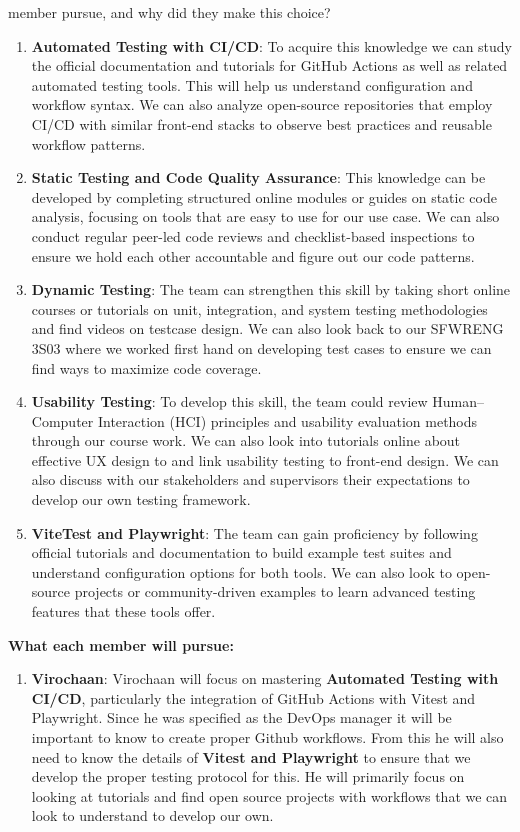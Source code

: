 \documentclass[12pt, titlepage]{article}
\begin{document}
\begin{enumerate}
{  member pursue, and why did they make this choice?}
  \begin{enumerate}
    \item \textbf{Automated Testing with CI/CD}:
    To acquire this knowledge we can study the official documentation and tutorials for GitHub Actions as well as related automated testing tools. This will help us understand configuration and workflow syntax. We can also analyze open-source repositories that employ CI/CD with similar front-end stacks to observe best practices and reusable workflow patterns.
    \item \textbf{Static Testing and Code Quality Assurance}:
    This knowledge can be developed by completing structured online modules or guides on static code analysis, focusing on tools that are easy to use for our use case. We can also conduct regular peer-led code reviews and checklist-based inspections to ensure we hold each other accountable and figure out our code patterns.

    \item \textbf{Dynamic Testing}:
    The team can strengthen this skill by taking short online courses or tutorials on unit, integration, and system testing methodologies and find videos on testcase design. We can also look back to our SFWRENG 3S03 where we worked first hand on developing test cases to ensure we can find ways to maximize code coverage.

    \item \textbf{Usability Testing}:
    To develop this skill, the team could review Human–Computer Interaction (HCI) principles and usability evaluation methods through our course work. We can also look into tutorials online about effective UX design to and link usability testing to front-end design. We can also discuss with our stakeholders and supervisors their expectations to develop our own testing framework.


    \item \textbf{ViteTest and Playwright}:
    The team can gain proficiency by following official tutorials and documentation to build example test suites and understand configuration options for both tools. We can also look to open-source projects or community-driven examples to learn advanced testing features that these tools offer. \newline
\end{enumerate}

\textbf{What each member will pursue:}
\begin{enumerate}
    \item \textbf{Virochaan}:  Virochaan will focus on mastering \textbf{Automated Testing with CI/CD}, particularly the integration of GitHub Actions with Vitest and Playwright. Since he was specified as the DevOps manager it will be important to know to create proper Github workflows. From this he will also need to know the details of \textbf{Vitest and Playwright} to ensure that we develop the proper testing protocol for this. He will primarily focus on looking at tutorials and find open source projects with workflows that we can look to understand to develop our own.


\end{enumerate}
\end{enumerate}
\end{document}

